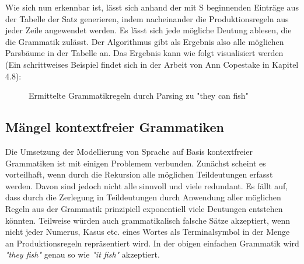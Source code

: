 \documentclass[12pt]{report}
\begin{document}
Wie sich nun erkennbar ist, lässt sich anhand der mit S beginnenden Einträge aus der Tabelle der Satz generieren, indem nacheinander die Produktionsregeln aus jeder Zeile angewendet werden. Es lässt sich jede mögliche Deutung ablesen, die die Grammatik zulässt. Der Algorithmus gibt als Ergebnis also alle möglichen Parsbäume in der Tabelle an. Das Ergebnis kann wie folgt visualisiert werden (Ein schrittweises Beispiel findet sich in der Arbeit von Ann Copestake \cite{cop04} in Kapitel 4.8):
\begin{figure}
\begin{center}
\caption{Ermittelte Grammatikregeln durch Parsing zu "they can fish"}
\end{center}
\end{figure}

\subsection{Mängel kontextfreier Grammatiken}
Die Umsetzung der Modellierung von Sprache auf Basis kontextfreier Grammatiken ist mit einigen Problemem verbunden. Zunächst scheint es vorteilhaft, wenn durch die Rekursion alle möglichen Teildeutungen erfasst werden. Davon sind jedoch nicht alle sinnvoll und viele redundant. Es fällt auf, dass durch die Zerlegung in Teildeutungen durch Anwendung aller möglichen Regeln aus der Grammatik prinzipiell exponentiell viele Deutungen entstehen könnten. Teilweise würden auch grammatikalisch falsche Sätze akzeptiert, wenn nicht jeder Numerus, Kasus etc. eines Wortes als Terminalsymbol in der Menge an Produktionsregeln repräsentiert wird. In der obigen einfachen Grammatik wird \textit{"they fish"} genau so wie \textit{"it fish"} akzeptiert. 
\end{document}
